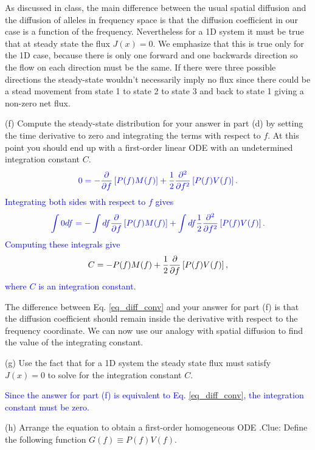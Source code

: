 \documentclass[12pt]{article}    %
\newcommand{\dd}[1]{{\partial \over \partial {#1}}}
\newcommand{\ddd}[1]{{\partial^2 \over \partial {#1} ^2}}
\begin{document}
As discussed in class, the main difference between the usual spatial diffusion
and the diffusion of alleles in frequency space is that the diffusion
coefficient in our case is a function of the frequency. Nevertheless for a 1D
system it must be true that at steady state the flux $J(x) = 0$. We emphasize
that this is true only for the 1D case, because there is only one forward and
one backwards direction so the flow on each direction must be the same. If there
were three possible directions the steady-state wouldn't necessarily imply no
flux since there could be a stead movement from state 1 to state 2 to state 3
and back to state 1 giving a non-zero net flux.

\noindent
(f) Compute the steady-state distribution for your answer in part (d) by setting
the time derivative to zero and integrating the terms with respect to $f$. At
this point you should end up with a first-order linear ODE with an undetermined
integration constant $C$.
\begin{equation}
  \color{blue}
  0 = - \dd{f}\left[ P(f) M(f) \right] +
  {1 \over 2} \ddd{f}\left[ P(f) V(f) \right].
\end{equation}
\textcolor{blue}{
Integrating both sides with respect to $f$ gives
\begin{equation}
  \color{blue}
  \int 0 df = - \int df \dd{f}\left[ P(f) M(f) \right] +
  \int df {1 \over 2} \ddd{f}\left[ P(f) V(f) \right].
\end{equation}
Computing these integrals give
\begin{equation}
C = - P(f)M(f) + {1 \over 2} \dd{f} \left[ P(f) V(f) \right],
\end{equation}
where $C$ is an integration constant.
}

The difference between Eq. \ref{eq_diff_conv} and your answer for part (f) is
that the diffusion coefficient should remain inside the derivative with respect
to the frequency coordinate. We can now use our analogy with spatial diffusion
to find the value of the integrating constant.

\noindent
(g) Use the fact that for a 1D system the steady state flux must satisfy $J(x)
= 0$ to solve for the integration constant $C$.

\textcolor{blue}{
Since the answer for part (f) is equivalent to Eq. \ref{eq_diff_conv}, the
integration constant must be zero.
}

\noindent
(h) Arrange the equation to obtain a first-order homogeneous ODE .Clue: Define
the following function $G(f) \equiv P(f)V(f)$.
\end{document}
